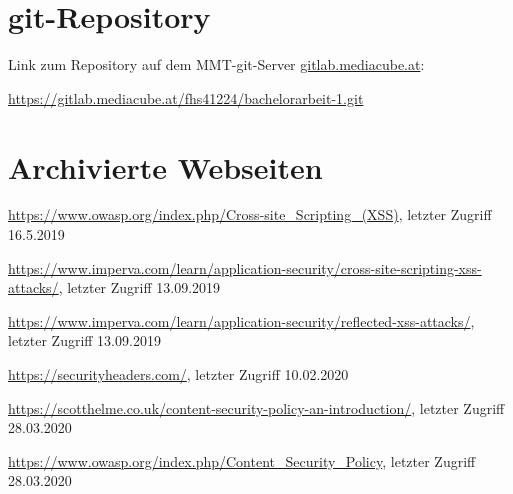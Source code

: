 \begin{appendices}



\section{git-Repository}

Link zum Repository auf dem MMT-git-Server {\url{gitlab.mediacube.at}}:

{\color{red}\url{https://gitlab.mediacube.at/fhs41224/bachelorarbeit-1.git}}

\section{Archivierte Webseiten}
\sloppy
\url{https://www.owasp.org/index.php/Cross-site_Scripting_(XSS)}, letzter Zugriff 16.5.2019

\url{https://www.imperva.com/learn/application-security/cross-site-scripting-xss-attacks/}, letzter Zugriff 13.09.2019

\url{https://www.imperva.com/learn/application-security/reflected-xss-attacks/}, letzter Zugriff 13.09.2019

\url{https://securityheaders.com/}, letzter Zugriff 10.02.2020

\url{https://scotthelme.co.uk/content-security-policy-an-introduction/}, letzter Zugriff 28.03.2020

\url{https://www.owasp.org/index.php/Content_Security_Policy}, letzter Zugriff 28.03.2020

\end{appendices}
